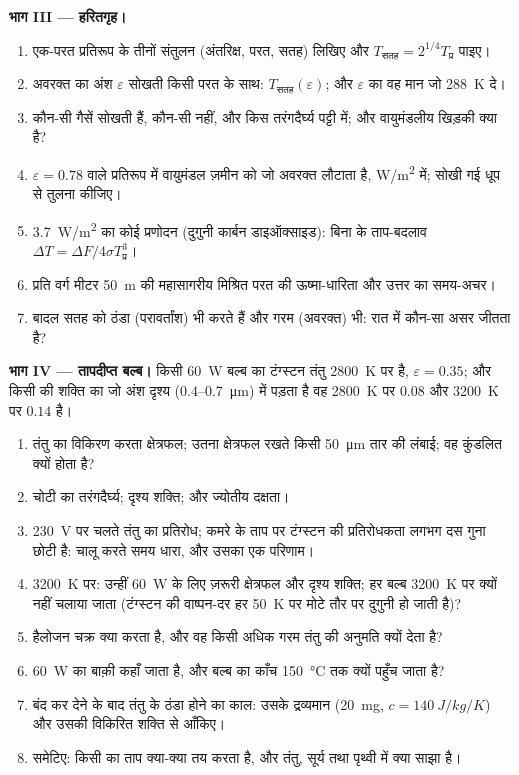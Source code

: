 \begin{problem}[{सप्ताहांत समस्या --- सूर्य से तंतु तक
कृष्णिकाएँ}]
\textbf{भाग III --- हरितगृह।}
\begin{enumerate}[resume]
  \item एक-परत प्रतिरूप के तीनों संतुलन (अंतरिक्ष, परत, सतह)
        लिखिए और $T_{\text{सतह}} = 2^{1/4}T_{\text{प्र}}$ पाइए।
  \item अवरक्त का अंश $\varepsilon$ सोखती किसी परत के साथ:
        $T_{\text{सतह}}(\varepsilon)$; और $\varepsilon$ का वह मान जो
        \qty{288}{K} दे।
  \item कौन-सी गैसें सोखती हैं, कौन-सी नहीं, और किस तरंगदैर्घ्य
        पट्टी में; और वायुमंडलीय खिड़की क्या है?
  \item $\varepsilon = 0.78$ वाले प्रतिरूप में वायुमंडल ज़मीन को जो अवरक्त
        लौटाता है, \unit{W/m^2} में; सोखी गई धूप से तुलना
        कीजिए।
  \item \qty{3.7}{W/m^2} का कोई प्रणोदन (दुगुनी कार्बन डाइऑक्साइड):
        बिना  के ताप-बदलाव $\Delta T = \Delta F/4\sigma T_{\text{प्र}}^3$।
  \item प्रति वर्ग मीटर \qty{50}{m} की महासागरीय मिश्रित परत की
        ऊष्मा-धारिता और उत्तर का समय-अचर।
  \item बादल सतह को ठंडा (परावर्तांश) भी करते हैं और गरम (अवरक्त) भी:
        रात में कौन-सा असर जीतता है?
\end{enumerate}

\textbf{भाग IV --- तापदीप्त बल्ब।}
किसी \qty{60}{W} बल्ब का टंग्स्टन तंतु \qty{2800}{K} पर है,
$\varepsilon = 0.35$; और किसी  की शक्ति का जो अंश
दृश्य ($0.4$--\qty{0.7}{\micro m}) में पड़ता है वह \qty{2800}{K} पर $0.08$ और
\qty{3200}{K} पर $0.14$ है।
\begin{enumerate}[resume]
  \item तंतु का विकिरण करता क्षेत्रफल; उतना क्षेत्रफल रखते किसी
        \qty{50}{\micro m} तार की लंबाई; वह कुंडलित क्यों होता है?
  \item चोटी का तरंगदैर्घ्य; दृश्य शक्ति; और ज्योतीय दक्षता।
  \item \qty{230}{V} पर चलते तंतु का प्रतिरोध; कमरे के ताप पर
        टंग्स्टन की प्रतिरोधकता लगभग दस गुना छोटी है:
        चालू करते समय धारा, और उसका एक परिणाम।
  \item \qty{3200}{K} पर: उन्हीं \qty{60}{W} के लिए ज़रूरी क्षेत्रफल और
        दृश्य शक्ति; हर बल्ब \qty{3200}{K} पर क्यों नहीं चलाया जाता
        (टंग्स्टन की वाष्पन-दर हर \qty{50}{K} पर मोटे तौर पर दुगुनी हो
        जाती है)?
  \item हैलोजन चक्र क्या करता है, और वह किसी अधिक गरम तंतु की
        अनुमति क्यों देता है?
  \item \qty{60}{W} का बाक़ी कहाँ जाता है, और बल्ब का काँच
        \qty{150}{\celsius} तक क्यों पहुँच जाता है?
  \item बंद कर देने के बाद तंतु के ठंडा होने का काल: उसके द्रव्यमान
        (\qty{20}{mg}, $c = \qty{140}{J/kg/K}$) और उसकी विकिरित
        शक्ति से आँकिए।
  \item समेटिए: किसी  का ताप क्या-क्या तय करता है, और
        तंतु, सूर्य तथा पृथ्वी में क्या साझा है।
\end{enumerate}
\end{problem}
